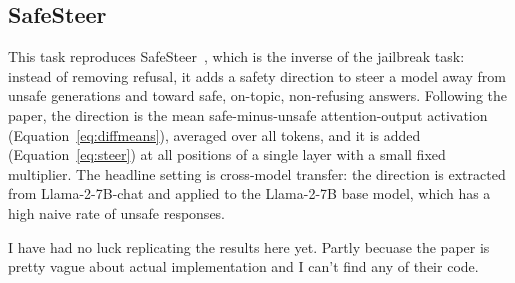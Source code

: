 \documentclass[a4paper,11pt]{article}
\begin{document}
\subsection{SafeSteer}

This task reproduces SafeSteer~\citep{ghosh2025safesteer}, which is the inverse of the jailbreak task: instead of removing refusal, it adds a safety direction to steer a model away from unsafe generations and toward safe, on-topic, non-refusing answers. Following the paper, the direction is the mean safe-minus-unsafe attention-output activation (Equation~\ref{eq:diffmeans}), averaged over all tokens, and it is added (Equation~\ref{eq:steer}) at all positions of a single layer with a small fixed multiplier. The headline setting is cross-model transfer: the direction is extracted from Llama-2-7B-chat and applied to the Llama-2-7B base model, which has a high naive rate of unsafe responses.

I have had no luck replicating the results here yet. Partly becuase the paper is pretty vague about actual implementation and I can't find any of their code.



\end{document}
